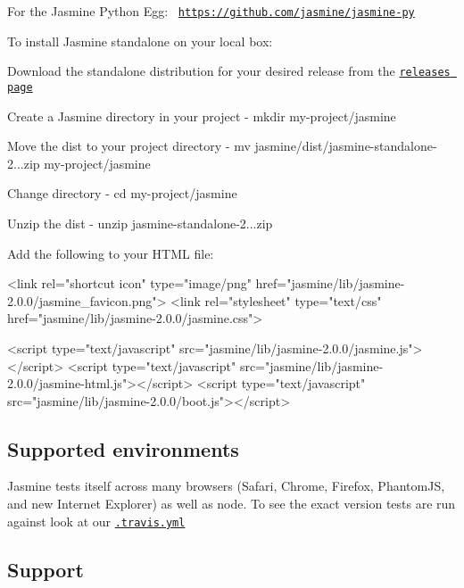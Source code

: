For the Jasmine Python Egg\+:~\newline
 \href{https://github.com/jasmine/jasmine-py}{\tt https\+://github.\+com/jasmine/jasmine-\/py}

To install Jasmine standalone on your local box\+:


\begin{DoxyItemize}
\item Download the standalone distribution for your desired release from the \href{https://github.com/jasmine/jasmine/releases}{\tt releases page}
\item Create a Jasmine directory in your project -\/ {\ttfamily mkdir my-\/project/jasmine}
\item Move the dist to your project directory -\/ {\ttfamily mv jasmine/dist/jasmine-\/standalone-\/2...\+zip my-\/project/jasmine}
\item Change directory -\/ {\ttfamily cd my-\/project/jasmine}
\item Unzip the dist -\/ {\ttfamily unzip jasmine-\/standalone-\/2...\+zip}
\end{DoxyItemize}

Add the following to your H\+T\+M\+L file\+: \begin{DoxyVerb}<link rel="shortcut icon" type="image/png" href="jasmine/lib/jasmine-2.0.0/jasmine_favicon.png">
<link rel="stylesheet" type="text/css" href="jasmine/lib/jasmine-2.0.0/jasmine.css">

<script type="text/javascript" src="jasmine/lib/jasmine-2.0.0/jasmine.js"></script>
<script type="text/javascript" src="jasmine/lib/jasmine-2.0.0/jasmine-html.js"></script>
<script type="text/javascript" src="jasmine/lib/jasmine-2.0.0/boot.js"></script>
\end{DoxyVerb}


\subsection*{Supported environments}

Jasmine tests itself across many browsers (Safari, Chrome, Firefox, Phantom\+J\+S, and new Internet Explorer) as well as node. To see the exact version tests are run against look at our \href{https://github.com/jasmine/jasmine/blob/master/.travis.yml}{\tt .travis.\+yml}

\subsection*{Support}


